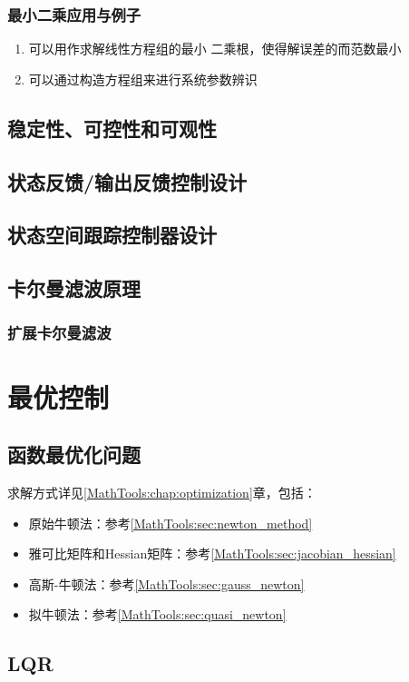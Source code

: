 \subsection{最小二乘应用与例子}
\begin{enumerate}
  \item 可以用作求解线性方程组的最小
二乘根，使得解误差的而范数最小
  \item 可以通过构造方程组来进行系统参数辨识
\end{enumerate}
\section{稳定性、可控性和可观性}
\section{状态反馈/输出反馈控制设计}
\section{状态空间跟踪控制器设计}
\section{卡尔曼滤波原理}
\subsection{扩展卡尔曼滤波}




\chapter{最优控制}
\section{函数最优化问题}
求解方式详见\ref{MathTools:chap:optimization}章，包括：
\begin{itemize}
    \item 原始牛顿法：参考\ref{MathTools:sec:newton_method}
    \item 雅可比矩阵和Hessian矩阵：参考\ref{MathTools:sec:jacobian_hessian}
    \item 高斯-牛顿法：参考\ref{MathTools:sec:gauss_newton}
    \item 拟牛顿法：参考\ref{MathTools:sec:quasi_newton}
\end{itemize}
\section{LQR}
